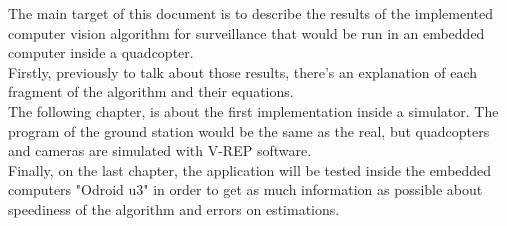 	The main target of this document is to describe the results of the implemented computer vision algorithm for surveillance that would be run in an embedded computer inside a quadcopter.  \\
	
	Firstly, previously to talk about those results, there's an explanation of each fragment of the algorithm and their equations. \\
	The following chapter, is about the first implementation inside a simulator. The program of the ground station would be the same as the real, but quadcopters and cameras are simulated with V-REP software. \\
	Finally, on the last chapter, the application will be tested inside the embedded computers "Odroid u3" in order to get as much information as possible about speediness of the  algorithm and errors on estimations.